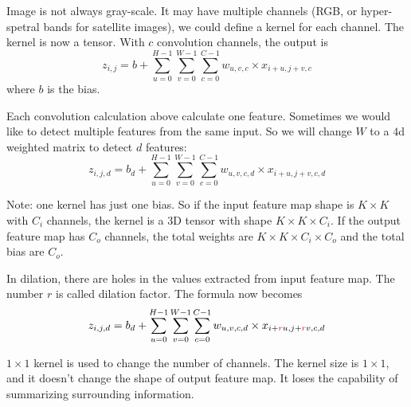 \begin{example}
    Image is not always gray-scale. It may have multiple channels (RGB, or hyper-spetral bands for satellite images), we could define a kernel for each channel. The kernel is now a tensor. With $c$ convolution channels, the output is
\begin{equation}
    z_{i,j} = b + \sum_{u=0}^{H-1} \sum_{v=0}^{W-1} \sum_{c=0}^{C-1} w_{u,v,c} \times x_{i+u,j+v,c}
\end{equation}
    where $b$ is the bias.
\end{example}


\begin{example}
    Each convolution calculation above calculate one feature. Sometimes we would like to detect multiple features from the same input. So we will change $W$ to a $4$d weighted matrix to detect $d$ features:
    \begin{equation}
        z_{i,j,d} = b_d + \sum_{u=0}^{H-1} \sum_{v=0}^{W-1} \sum_{c=0}^{C-1} w_{u,v,c,d} \times x_{i+u,j+v,c,d}
    \end{equation}
    
    Note: one kernel has just one bias. So if the input feature map shape is $K \times K$ with $C_i$ channels, the kernel is a 3D tensor with shape $K \times K \times C_i$. If the output feature map has $C_o$ channels, the total weights are $K \times K \times C_i \times C_o$ and the total bias are $C_o$.
\end{example}

\begin{example}
    In dilation, there are holes in the values extracted from input feature map. The number $r$ is called dilation factor. The formula now becomes
    \begin{equation}
        z_{i,j,d} = b_d + \sum_{u=0}^{H-1} \sum_{v=0}^{W-1} \sum_{c=0}^{C-1} w_{u,v,c,d} \times x_{i+{\color{red}r}u,j+{\color{red}r}v,c,d}
    \end{equation}
\end{example}


\begin{example}
    $1 \times 1$ kernel is used to change the number of channels. The kernel size is $1 \times 1$, and it doesn't change the shape of output feature map. It loses the capability of summarizing surrounding information.
\end{example}







